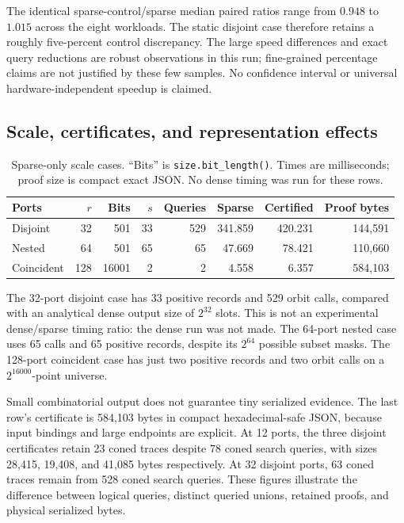 \documentclass[11pt,letterpaper]{article}
\theoremstyle{definition}
\newcommand{\code}[1]{\texttt{#1}}
\begin{document}
The identical sparse-control/sparse median paired ratios range from
$0.948$ to $1.015$ across the eight workloads. The static disjoint case
therefore retains a roughly five-percent control discrepancy. The large
speed differences and exact query reductions are robust observations in
this run; fine-grained percentage claims are not justified by these few
samples. No confidence interval or universal hardware-independent speedup
is claimed.

\subsection{Scale, certificates, and representation effects}
\begin{table}[htbp]
\centering
\small
\setlength{\tabcolsep}{4pt}
\begin{tabular}{@{}lrrrrrrr@{}}
\toprule
Ports & $r$ & Bits & $s$ & Queries & Sparse & Certified & Proof bytes\\
\midrule
Disjoint & 32 & 501 & 33 & 529 & 341.859 & 420.231 & 144,591 \\
Nested & 64 & 501 & 65 & 65 & 47.669 & 78.421 & 110,660 \\
Coincident & 128 & 16001 & 2 & 2 & 4.558 & 6.357 & 584,103 \\
\bottomrule
\end{tabular}
\caption{Sparse-only scale cases. ``Bits'' is \code{size.bit\_length()}.
Times are milliseconds; proof size is compact exact JSON. No dense timing
was run for these rows.}
\label{tab:scale}
\end{table}

The 32-port disjoint case has 33 positive records and 529 orbit calls,
compared with an analytical dense output size of $2^{32}$ slots. This is
not an experimental dense/sparse timing ratio: the dense run was not made.
The 64-port nested case uses 65 calls and 65 positive records, despite its
$2^{64}$ possible subset masks. The 128-port coincident case has just two
positive records and two orbit calls on a $2^{16000}$-point universe.

Small combinatorial output does not guarantee tiny serialized evidence.
The last row's certificate is 584,103 bytes in compact hexadecimal-safe
JSON, because input bindings and large endpoints are explicit. At 12 ports,
the three disjoint certificates retain 23 coned traces despite 78 coned
search queries, with sizes 28,415, 19,408, and 41,085 bytes respectively.
At 32 disjoint ports, 63 coned traces remain from 528 coned search queries.
These figures illustrate the difference between logical queries, distinct
queried unions, retained proofs, and physical serialized bytes.
\end{document}
